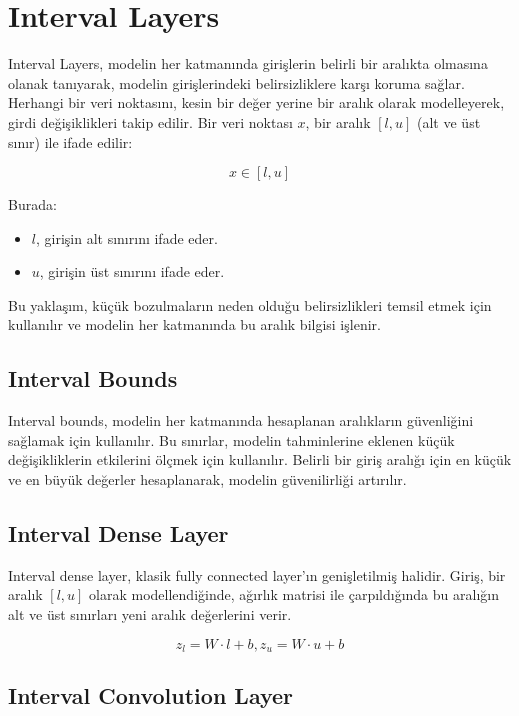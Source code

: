\section{Interval Layers}

Interval Layers, modelin her katmanında girişlerin belirli bir aralıkta olmasına olanak tanıyarak, modelin girişlerindeki belirsizliklere karşı koruma sağlar. Herhangi bir veri noktasını, kesin bir değer yerine bir aralık olarak modelleyerek, girdi değişiklikleri takip edilir. Bir veri noktası $x$, bir aralık $[l,u]$ (alt ve üst sınır) ile ifade edilir:

\[ x \in [l, u] \]

Burada:

\begin{itemize}
    \item $l$, girişin alt sınırını ifade eder.
    \item $u$, girişin üst sınırını ifade eder.
\end{itemize}

Bu yaklaşım, küçük bozulmaların neden olduğu belirsizlikleri temsil etmek için kullanılır ve modelin her katmanında bu aralık bilgisi işlenir.

\subsection{Interval Bounds}

Interval bounds, modelin her katmanında hesaplanan aralıkların güvenliğini sağlamak için kullanılır. Bu sınırlar, modelin tahminlerine eklenen küçük değişikliklerin etkilerini ölçmek için kullanılır. Belirli bir giriş aralığı için en küçük ve en büyük değerler hesaplanarak, modelin güvenilirliği artırılır.

\subsection{Interval Dense Layer}

Interval dense layer, klasik fully connected layer'ın genişletilmiş halidir. Giriş, bir aralık $[l, u]$ olarak modellendiğinde, ağırlık matrisi ile çarpıldığında bu aralığın alt ve üst sınırları yeni aralık değerlerini verir.

\[ z_l = W \cdot l + b, z_u = W \cdot u + b \]

\subsection{Interval Convolution Layer}

